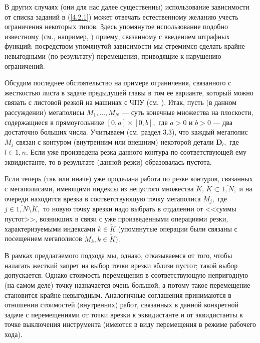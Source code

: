 \documentclass[11pt,twoside,openany]{report}
\newcommand{\ov}{\overline}
\newcommand{\su}{\subset}
\newcommand{\sm}{\setminus}
\begin{document}
{В других случаях (они для нас далее существенны) использование зависимости
от списка заданий в (\ref{4.2.1}) может отвечать естественному желанию учесть
ограничения некоторых типов. Здесь упомянутое использование подобно известному
(см., например, \cite[202--205]{Cha9`}) приему, связанному с введением
штрафных функций: посредством упомянутой зависимости мы стремимся сделать
крайне невыгодными  (по результату) перемещения, приводящие к нарушению
ограничений.

Обсудим последнее обстоятельство на примере ограничения, связанного с
жесткостью листа в задаче предыдущей главы в том ее варианте, который можно
связать с листовой резкой на машинах с ЧПУ (см. \cite{Cha10`}). Итак, пусть
(в данном рассуждении) мегаполисы $M_1,\ldots,M_N$ --- суть конечные
множества на плоскости, содержащиеся в прямоугольнике $[0,a] \times
[0,b],$ где $a > 0$ и $b> 0$ --- два достаточно больших числа. Учитываем
(см. раздел 3.3), что   каждый мегаполис $M_j$ связан с контуром
(внутренним или внешним) некоторой детали $\mathbf{D}_l,$ где $l\in
\ov{1,n}.$ Если уже произведена резка данного контура по соответствующей
ему эквидистанте, то в результате (данной резки) образовалась пустота.

Если теперь (так или иначе) уже проделана работа по резке контуров,
связанных с мегаполисами, имеющими индексы из непустого множества
$\widetilde{K},\, \widetilde{K}\su \ov{1,N},$ и на очереди находится
врезка в соответствующую точку мегаполиса $M_j,$ где $j\in \ov{1,N}\sm
\widetilde{K},$ то новую точку врезки надо выбрать  в отдалении от
<<суммы пустот>>, возникших в связи с уже произведенными операциями
резки, характеризуемыми индексами $k\in \widetilde{K}$ (упомянутые
операции были связаны с посещением мегаполисов $M_k, k\in \widetilde{K}).$

В рамках предлагаемого подхода мы, однако, отказываемся от того, чтобы
налагать жесткий запрет на выбор точки врезки вблизи пустот; такой выбор
допускается. Однако стоимость перемещения в соответствующую непригодную
(на самом деле) точку назначается очень большой, а потому такое перемещение
становится крайне невыгодным.  Аналогичные соглашения принимаются в отношении
стоимостей (внутренних) работ, связанных в данной конкретной задаче  с
перемещениями от точки врезки к эквидистанте и от эквидистанты к точке
выключения инструмента (имеются в виду перемещения в режиме рабочего хода).

}
\end{document}
